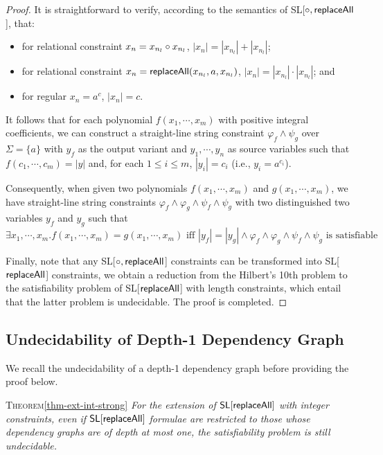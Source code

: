 \begin{proof}
{		It is straightforward to verify, according to the semantics of SL[$\circ, \mathsf{replaceAll}$], that:
		\begin{itemize}
			\item for relational constraint $x_n= x_{n_l}\circ x_{n_l}$, $|x_n|= |x_{n_l}|+|x_{n_l}|$; 
			\item for relational constraint $x_n= \mathsf{replaceAll}(x_{n_l}, a, x_{n_l})$,  $|x_n|= |x_{n_l}|\cdot |x_{n_l}|$; and 
			\item for regular $x_n=a^c$, $|x_n|=c$. 
		\end{itemize}
		
		It follows that for each polynomial $f(x_1, \cdots, x_m)$ with positive integral coefficients, we can construct a straight-line string constraint $\varphi_{f}\wedge\psi_g$ over $\Sigma=\{a\}$ with $y_f$ as the output variant and $y_1, \cdots, y_n$ as source variables such that
		$f(c_1, \cdots, c_m)=|y|$ and, for each $1\leq i\leq m$, $|y_i|= c_i$ (i.e., $y_i=a^{c_i}$).  
		
		Consequently, when given two polynomials $f(x_1, \cdots, x_m)$ and $g(x_1, \cdots, x_m)$, we have straight-line string constraints $\varphi_{f}\wedge \varphi_{g}\wedge \psi_{f}\wedge \psi_g$ with two distinguished two variables  $y_f$ and $y_g$ such that  
		\[\exists x_1, \cdots, x_m. f(x_1, \cdots, x_m)=g(x_1, \cdots, x_m)\mbox{ iff } |y_f|=|y_g|\wedge \varphi_{f}\wedge \varphi_{g}\wedge \psi_{f}\wedge \psi_g\mbox{ is satisfiable} \]
		
		Finally, note that any  SL[$\circ, \mathsf{replaceAll}$] constraints can be transformed into SL[$\mathsf{replaceAll}$] constraints, we obtain a reduction from the Hilbert's 10th problem to the satisfiability problem of  SL[$\mathsf{replaceAll}$] with length constraints, which entail that the latter problem is undecidable. The proof is completed. 
	}
\end{proof}

\subsection{Undecidability of Depth-1 Dependency Graph}

We recall the undecidability of a depth-1 dependency graph before providing the proof below.

\medskip

\noindent\textsc{Theorem}\ref{thm-ext-int-strong}
{\em
	For the extension of $\mathsf{SL}[\mathsf{replaceAll}]$ with integer constraints, even if $\mathsf{SL}[\mathsf{replaceAll}]$ formulae are restricted to those whose dependency graphs are of depth at most one, the satisfiability problem is still undecidable.
}

